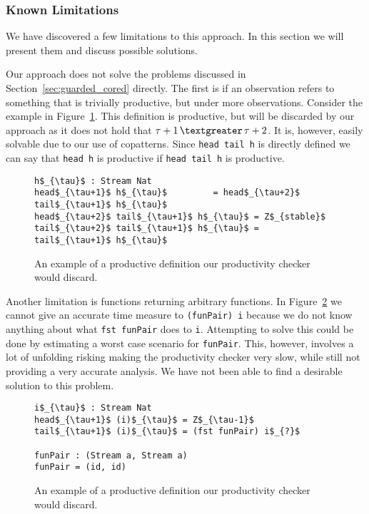 \subsubsection{Known Limitations}
We have discovered a few limitations to this approach. In this section we will present them and discuss possible solutions.

Our approach does not solve the problems discussed in Section~\ref{sec:guarded_cored} directly. The first is if an observation refers to something that is trivially productive, but under more observations. Consider the example in Figure~\ref{fig:forwardRef}. This definition is productive, but will be discarded by our approach as it does not hold that $\tau+1\,\textgreater\,\tau+2$. It is, however, easily solvable due to our use of copatterns. Since \texttt{head tail h} is directly defined we can say that \texttt{head h} is productive if \texttt{head tail h} is productive.

\begin{figure}
\begin{Verbatim}[commandchars=\\\{\},codes={\catcode`$=3\catcode`_=8}]
h$_{\tau}$ : Stream Nat
head$_{\tau+1}$ h$_{\tau}$         = head$_{\tau+2}$ tail$_{\tau+1}$ h$_{\tau}$
head$_{\tau+2}$ tail$_{\tau+1}$ h$_{\tau}$ = Z$_{stable}$
tail$_{\tau+2}$ tail$_{\tau+1}$ h$_{\tau}$ = tail$_{\tau+1}$ h$_{\tau}$
\end{Verbatim}
\caption{An example of a productive definition our productivity checker would discard.}
\label{fig:forwardRef}
\end{figure}

Another limitation is functions returning arbitrary functions. In Figure~\ref{fig:funList} we cannot give an accurate time measure to \texttt{(funPair) i} because we do not know anything about what \texttt{fst funPair} does to \texttt{i}. Attempting to solve this could be done by estimating a worst case scenario for \texttt{funPair}. This, however, involves a lot of unfolding risking making the productivity checker very slow, while still not providing a very accurate analysis. We have not been able to find a desirable solution to this problem.

\begin{figure}
\begin{Verbatim}[commandchars=\\\{\},codes={\catcode`$=3\catcode`_=8}]
i$_{\tau}$ : Stream Nat
head$_{\tau+1}$ (i)$_{\tau}$ = Z$_{\tau-1}$
tail$_{\tau+1}$ (i)$_{\tau}$ = (fst funPair) i$_{?}$

funPair : (Stream a, Stream a)
funPair = (id, id)
\end{Verbatim}
\caption{An example of a productive definition our productivity checker would discard.}
\label{fig:funList}
\end{figure}

